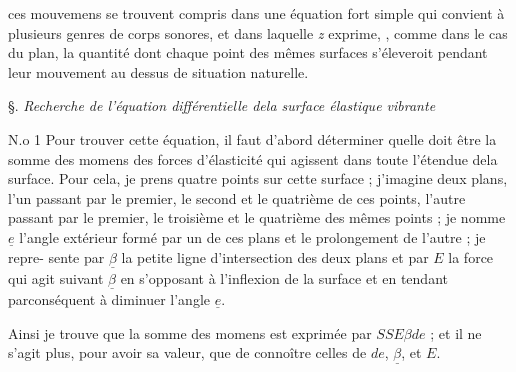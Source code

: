 \documentclass[11pt,a4paper]{article}
\begin{document}
ces mouvemens se trouvent compris dans une équation fort simple qui convient
à plusieurs genres de corps sonores, et dans laquelle \emph{z} exprime,
,
comme dans le cas du plan, la quantité dont chaque point des
mêmes surfaces s'éleveroit pendant leur mouvement au dessus de 
situation naturelle.

§. \emph{Recherche de l'équation différentielle dela surface élastique vibrante}

N.o 1 Pour trouver cette équation, il faut d'abord déterminer quelle doit
être la somme des momens des forces d'élasticité qui agissent dans
toute l'étendue dela surface. Pour cela, je prens quatre points sur
cette surface ; j'imagine deux plans, l'un passant par le premier, le
second et le quatrième de ces points, l'autre passant par le premier, le
troisième et le quatrième des mêmes points ; je nomme $\underline{e}$ l'angle extérieur
formé par un de ces plans et le prolongement de l'autre ; je repre-
sente par $\underline{\beta}$ la petite ligne d'intersection des deux plans et par
$E$ la force qui agit suivant $\underline{\beta}$ en s'opposant à l'inflexion de
la surface et en tendant parconséquent à diminuer l'angle $\underline{e}$.

Ainsi je trouve que la somme des momens est exprimée par $SSE\beta de$ ;
et il ne s'agit plus, pour avoir sa valeur, que de connoître
celles de $de$, $\underline{\beta}$, et $E$.
\end{document}
